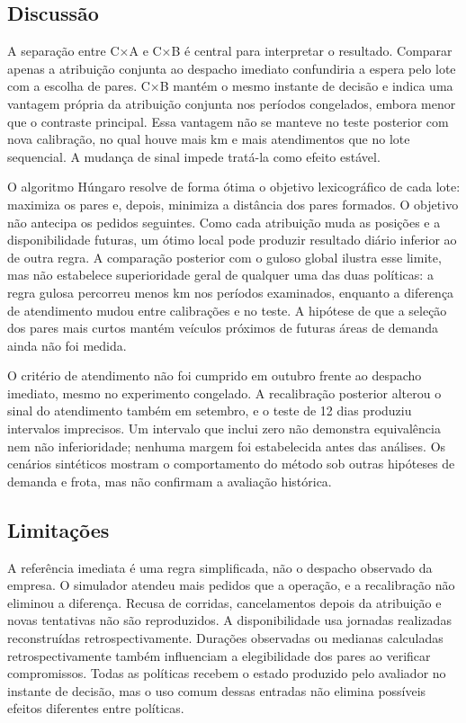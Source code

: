 \subsection{Discussão}

A separação entre C×A e C×B é central para interpretar o resultado. Comparar apenas a atribuição conjunta ao despacho imediato confundiria a espera pelo lote com a escolha de pares. C×B mantém o mesmo instante de decisão e indica uma vantagem própria da atribuição conjunta nos períodos congelados, embora menor que o contraste principal. Essa vantagem não se manteve no teste posterior com nova calibração, no qual houve mais km e mais atendimentos que no lote sequencial. A mudança de sinal impede tratá-la como efeito estável.

O algoritmo Húngaro resolve de forma ótima o objetivo lexicográfico de cada lote: maximiza os pares e, depois, minimiza a distância dos pares formados. O objetivo não antecipa os pedidos seguintes. Como cada atribuição muda as posições e a disponibilidade futuras, um ótimo local pode produzir resultado diário inferior ao de outra regra. A comparação posterior com o guloso global ilustra esse limite, mas não estabelece superioridade geral de qualquer uma das duas políticas: a regra gulosa percorreu menos km nos períodos examinados, enquanto a diferença de atendimento mudou entre calibrações e no teste. A hipótese de que a seleção dos pares mais curtos mantém veículos próximos de futuras áreas de demanda ainda não foi medida.

O critério de atendimento não foi cumprido em outubro frente ao despacho imediato, mesmo no experimento congelado. A recalibração posterior alterou o sinal do atendimento também em setembro, e o teste de 12 dias produziu intervalos imprecisos. Um intervalo que inclui zero não demonstra equivalência nem não inferioridade; nenhuma margem foi estabelecida antes das análises. Os cenários sintéticos mostram o comportamento do método sob outras hipóteses de demanda e frota, mas não confirmam a avaliação histórica.

\subsection{Limitações}

A referência imediata é uma regra simplificada, não o despacho observado da empresa. O simulador atendeu mais pedidos que a operação, e a recalibração não eliminou a diferença. Recusa de corridas, cancelamentos depois da atribuição e novas tentativas não são reproduzidos. A disponibilidade usa jornadas realizadas reconstruídas retrospectivamente. Durações observadas ou medianas calculadas retrospectivamente também influenciam a elegibilidade dos pares ao verificar compromissos. Todas as políticas recebem o estado produzido pelo avaliador no instante de decisão, mas o uso comum dessas entradas não elimina possíveis efeitos diferentes entre políticas.

